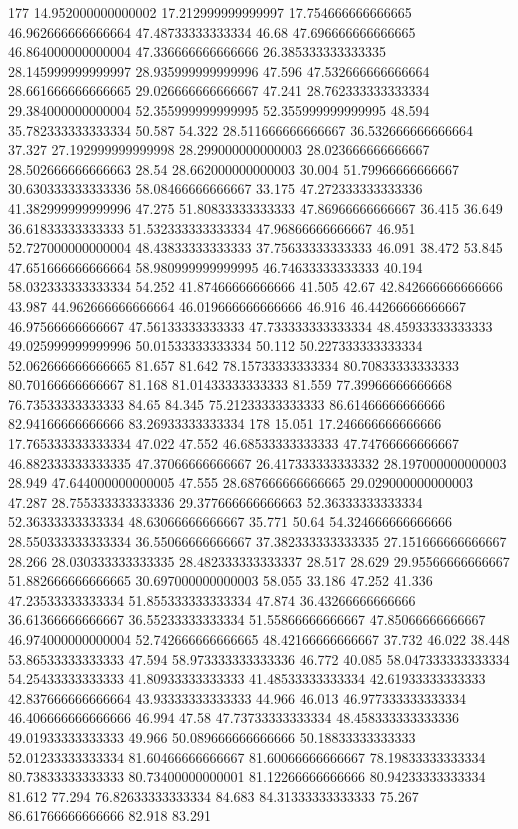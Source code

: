 177 14.952000000000002 17.212999999999997 17.754666666666665 46.962666666666664 47.48733333333334 46.68 47.696666666666665 46.864000000000004 47.336666666666666 26.385333333333335 28.145999999999997 28.935999999999996 47.596 47.532666666666664 28.661666666666665 29.026666666666667 47.241 28.762333333333334 29.384000000000004 52.355999999999995 52.355999999999995 48.594 35.782333333333334 50.587 54.322 28.511666666666667 36.532666666666664 37.327 27.192999999999998 28.299000000000003 28.023666666666667 28.502666666666663 28.54 28.662000000000003 30.004 51.79966666666667 30.630333333333336 58.08466666666667 33.175 47.272333333333336 41.382999999999996 47.275 51.80833333333333 47.86966666666667 36.415 36.649 36.61833333333333 51.532333333333334 47.96866666666667 46.951 52.727000000000004 48.43833333333333 37.75633333333333 46.091 38.472 53.845 47.651666666666664 58.980999999999995 46.74633333333333 40.194 58.032333333333334 54.252 41.87466666666666 41.505 42.67 42.842666666666666 43.987 44.962666666666664 46.019666666666666 46.916 46.44266666666667 46.97566666666667 47.56133333333333 47.733333333333334 48.45933333333333 49.025999999999996 50.01533333333334 50.112 50.227333333333334 52.062666666666665 81.657 81.642 78.15733333333334 80.70833333333333 80.70166666666667 81.168 81.01433333333333 81.559 77.39966666666668 76.73533333333333 84.65 84.345 75.21233333333333 86.61466666666666 82.94166666666666 83.26933333333334
178 15.051 17.246666666666666 17.765333333333334 47.022 47.552 46.68533333333333 47.74766666666667 46.882333333333335 47.37066666666667 26.417333333333332 28.197000000000003 28.949 47.644000000000005 47.555 28.687666666666665 29.029000000000003 47.287 28.755333333333336 29.377666666666663 52.36333333333334 52.36333333333334 48.63066666666667 35.771 50.64 54.324666666666666 28.550333333333334 36.55066666666667 37.382333333333335 27.151666666666667 28.266 28.030333333333335 28.482333333333337 28.517 28.629 29.95566666666667 51.882666666666665 30.697000000000003 58.055 33.186 47.252 41.336 47.23533333333334 51.855333333333334 47.874 36.43266666666666 36.61366666666667 36.55233333333334 51.55866666666667 47.85066666666667 46.974000000000004 52.742666666666665 48.42166666666667 37.732 46.022 38.448 53.86533333333333 47.594 58.973333333333336 46.772 40.085 58.047333333333334 54.25433333333333 41.80933333333333 41.48533333333334 42.61933333333333 42.837666666666664 43.93333333333333 44.966 46.013 46.977333333333334 46.406666666666666 46.994 47.58 47.73733333333334 48.458333333333336 49.01933333333333 49.966 50.089666666666666 50.18833333333333 52.01233333333334 81.60466666666667 81.60066666666667 78.19833333333334 80.73833333333333 80.73400000000001 81.12266666666666 80.94233333333334 81.612 77.294 76.82633333333334 84.683 84.31333333333333 75.267 86.61766666666666 82.918 83.291
